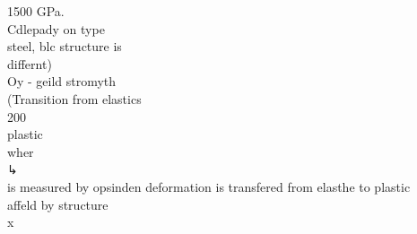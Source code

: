 1500 GPa. \\ Cdlepady on type \\ steel, blc structure is \\ differnt) \\ Oy - geild stromyth \\ (Transition from elastics \\ 200 \\ plastic \\ wher \\ ↳ \\ is measured by opsinden deformation is transfered from elasthe to plastic \\ affeld by structure \\ x